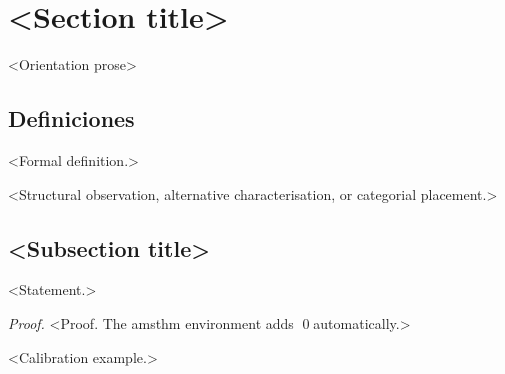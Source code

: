 
\section{<Section title>}
\label{sec:<area>_<slug>}


<Orientation prose>


\subsection{Definiciones}
\label{sec:<slug>_defs}

\begin{definition}
\label{def:<slug>_<term>}
  <Formal definition.>
\end{definition}

\begin{remark}
  <Structural observation, alternative characterisation, or categorial placement.>
\end{remark}


\subsection{<Subsection title>}
\label{sec:<slug>_<sub>}

\begin{proposition}
\label{prop:<slug>_<name>}
  <Statement.>
\end{proposition}

\begin{proof}
  <Proof. The amsthm environment adds \qed automatically.>
\end{proof}

\begin{example}
\label{ex:<slug>_<name>}
  <Calibration example.>
\end{example}

